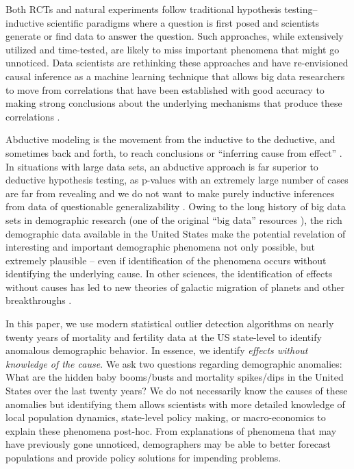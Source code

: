 \documentclass[12pt]{article}
\begin{document}
Both RCTs and natural experiments follow traditional hypothesis
testing--inductive scientific paradigms where a question is first posed
and scientists generate or find data to answer the question. Such
approaches, while extensively utilized and time-tested, are likely to
miss important phenomena that might go unnoticed. Data scientists are
rethinking these approaches and have re-envisioned causal inference as a
machine learning technique that allows big data researchers to move from
correlations that have been established with good accuracy to making
strong conclusions about the underlying mechanisms that produce these
correlations \citep{pearl2018book}.

Abductive modeling is the movement from the inductive to the deductive,
and sometimes back and forth, to reach conclusions
\citep{bryant2014realm} or ``inferring cause from effect''
\citep{Crowder2017}. In situations with large data sets, an abductive
approach is far superior to deductive hypothesis testing, as p-values
with an extremely large number of cases are far from revealing
\citep{head2015extent, nuzzo2014scientific} and we do not want to make
purely inductive inferences from data of questionable generalizability
\citep{ruggles2014big}. Owing to the long history of big data sets in
demographic research (one of the original ``big data'' resources
\citep{ruggles2014big}), the rich demographic data available in the
United States make the potential revelation of interesting and important
demographic phenomena not only possible, but extremely plausible -- even
if identification of the phenomena occurs without identifying the
underlying cause. In other sciences, the identification of effects
without causes has led to new theories of galactic migration of planets
and other breakthroughs \citep{gomes2005n}.

In this paper, we use modern statistical outlier detection algorithms
\citep{chen1993joint} on nearly twenty years of mortality and fertility
data at the US state-level to identify anomalous demographic behavior.
In essence, we identify \emph{effects without knowledge of the cause}.
We ask two questions regarding demographic anomalies: What are the
hidden baby booms/busts and mortality spikes/dips in the United States
over the last twenty years? We do not necessarily know the causes of
these anomalies but identifying them allows scientists with more
detailed knowledge of local population dynamics, state-level policy
making, or macro-economics to explain these phenomena post-hoc. From
explanations of phenomena that may have previously gone unnoticed,
demographers may be able to better forecast populations and provide
policy solutions for impending problems.
\end{document}
